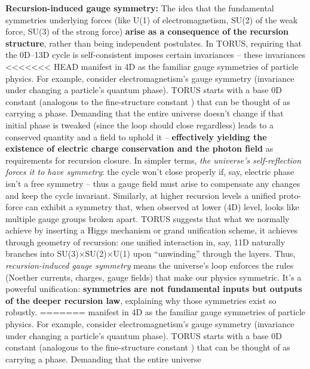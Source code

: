 \documentclass[]{article}
\begin{document}
\textbf{Recursion-induced gauge symmetry:} The idea that the fundamental
symmetries underlying forces (like U(1) of electromagnetism, SU(2) of
the weak force, SU(3) of the strong force) \textbf{arise as a
consequence of the recursion structure}, rather than being independent
postulates. In TORUS, requiring that the 0D--13D cycle is
self-consistent imposes certain invariances -- these invariances
<<<<<<< HEAD
manifest in 4D as the familiar gauge symmetries of particle
physics\hspace{0pt}. For example, consider electromagnetism's gauge
symmetry (invariance under changing a particle's quantum phase). TORUS
starts with a base 0D constant (analogous to the fine-structure constant
\alpha) that can be thought of as carrying a phase. Demanding that the entire
universe doesn't change if that initial phase is tweaked (since the loop
should close regardless) leads to a conserved quantity and a field to
uphold it -- \textbf{effectively yielding the existence of electric
charge conservation and the photon field} as requirements for recursion
closure\hspace{0pt}. In simpler terms, \emph{the universe's
self-reflection forces it to have symmetry}: the cycle won't close
properly if, say, electric phase isn't a free symmetry -- thus a gauge
field must arise to compensate any changes and keep the cycle invariant.
Similarly, at higher recursion levels a unified proto-force can exhibit
a symmetry that, when observed at lower (4D) level, looks like multiple
gauge groups broken apart\hspace{0pt}. TORUS suggests that what we
normally achieve by inserting a Higgs mechanism or grand unification
scheme, it achieves through geometry of recursion: one unified
interaction in, say, 11D naturally branches into SU(3)×SU(2)×U(1) upon
``unwinding'' through the layers\hspace{0pt}. Thus,
\emph{recursion-induced gauge symmetry} means the universe's loop
enforces the rules (Noether currents, charges, gauge fields) that make
our physics symmetric. It's a powerful unification: \textbf{symmetries
are not fundamental inputs but outputs of the deeper recursion law},
explaining why those symmetries exist so robustly.
=======
manifest in 4D as the familiar gauge symmetries of particle physics​.
For example, consider electromagnetism's gauge symmetry (invariance
under changing a particle's quantum phase). TORUS starts with a base 0D
constant (analogous to the fine-structure constant \alpha) that can be
thought of as carrying a phase. Demanding that the entire universe
\end{document}
